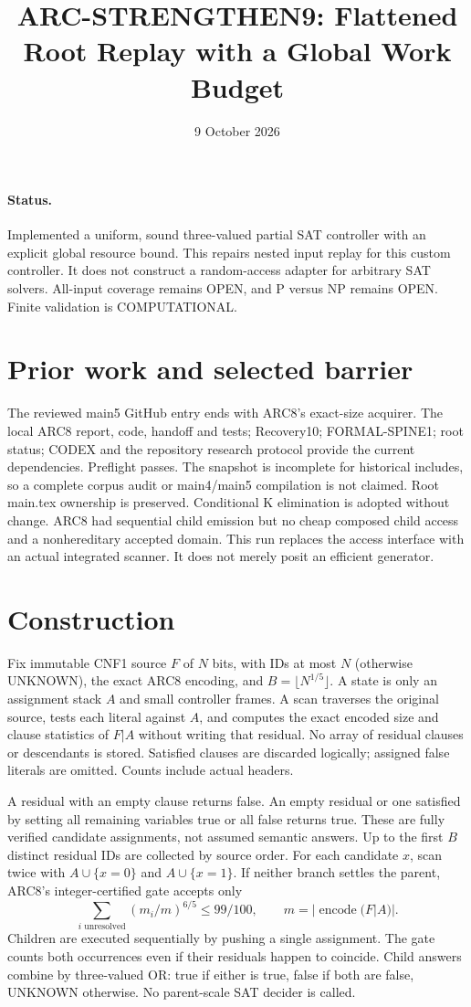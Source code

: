 \documentclass[11pt]{article}
\title{ARC-STRENGTHEN9: Flattened Root Replay with a Global Work Budget}
\date{9 October 2026}
\begin{document}
\maketitle
\paragraph{Status.} Implemented a uniform, sound three-valued partial SAT
controller with an explicit global resource bound. This repairs nested input
replay for this custom controller. It does not construct a random-access adapter
for arbitrary SAT solvers. All-input coverage remains OPEN, and P versus NP
remains OPEN. Finite validation is COMPUTATIONAL.

\section{Prior work and selected barrier}
The reviewed main5 GitHub entry ends with ARC8's exact-size acquirer. The local
ARC8 report, code, handoff and tests; Recovery10; FORMAL-SPINE1; root status;
CODEX and the repository research protocol provide the current dependencies.
Preflight passes. The snapshot is incomplete for historical includes, so a
complete corpus audit or main4/main5 compilation is not claimed. Root main.tex
ownership is preserved. Conditional K elimination is adopted without change.
ARC8 had sequential child emission but no cheap composed child access and a
nonhereditary accepted domain. This run replaces the access interface with an
actual integrated scanner. It does not merely posit an efficient generator.

\section{Construction}
Fix immutable CNF1 source $F$ of $N$ bits, with IDs at most $N$ (otherwise
UNKNOWN), the exact ARC8 encoding, and $B=\lfloor N^{1/5}\rfloor$. A state is
only an assignment stack $A$ and small controller frames. A scan traverses the
original source, tests each literal against $A$, and computes the exact encoded
size and clause statistics of $F|A$ without writing that residual. No array of
residual clauses or descendants is stored. Satisfied clauses are discarded
logically; assigned false literals are omitted. Counts include actual headers.

A residual with an empty clause returns false. An empty residual or one
satisfied by setting all remaining variables true or all false returns true.
These are fully verified candidate assignments, not assumed semantic answers.
Up to the first $B$ distinct residual IDs are collected by source order. For
each candidate $x$, scan twice with $A\cup\{x=0\}$ and $A\cup\{x=1\}$.
If neither branch settles the parent, ARC8's integer-certified gate accepts only
\[
 \sum_{i\text{ unresolved}}(m_i/m)^{6/5}\le 99/100,
 \qquad m=|\operatorname{encode}(F|A)|.
\]
Children are executed sequentially by pushing a single assignment. The gate
counts both occurrences even if their residuals happen to coincide. Child
answers combine by three-valued OR: true if either is true, false if both
are false, UNKNOWN otherwise. No parent-scale SAT decider is called.
\end{document}

